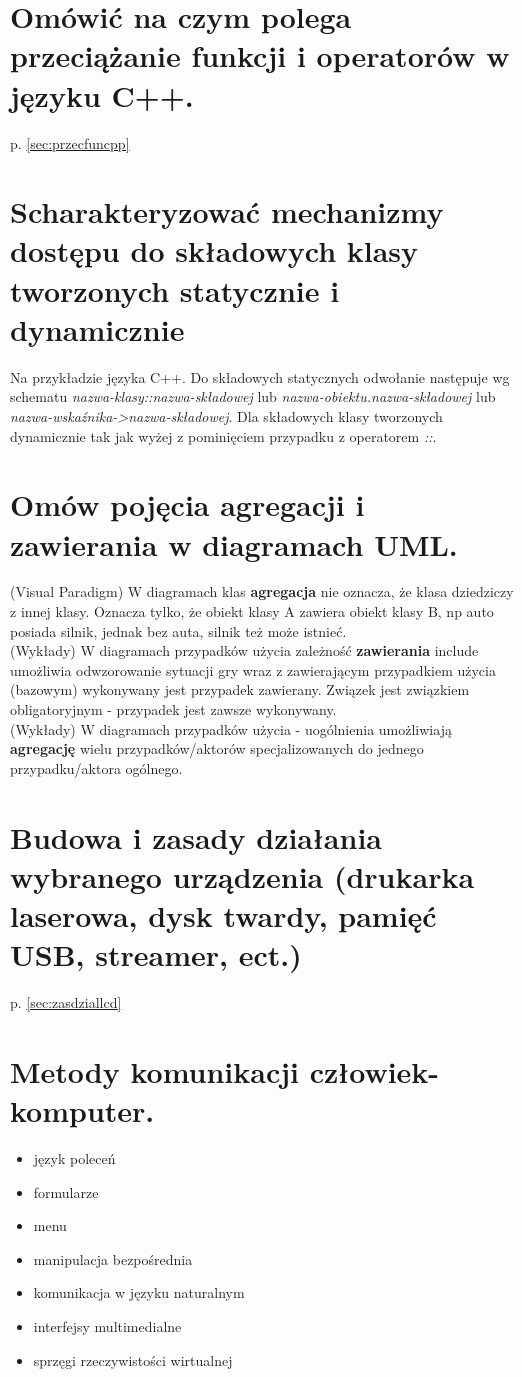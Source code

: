 \documentclass[12pt,a4paper]{article}
\begin{document}
	\section{Omówić na czym polega przeciążanie funkcji i operatorów w języku C++.}
	p. \ref{sec:przecfuncpp}

	\section{Scharakteryzować mechanizmy dostępu do składowych klasy tworzonych statycznie i dynamicznie}
	Na przykładzie języka C++. Do składowych statycznych odwołanie następuje wg schematu \textit{nazwa-klasy::nazwa-składowej} lub \textit{nazwa-obiektu.nazwa-składowej} lub \textit{nazwa-wskaźnika->nazwa-składowej}. Dla składowych klasy tworzonych dynamicznie tak jak wyżej z pominięciem przypadku z operatorem \textit{::}.

	\section{Omów pojęcia agregacji i zawierania w diagramach UML.}
	(Visual Paradigm) W diagramach klas \textbf{agregacja} nie oznacza, że klasa dziedziczy z innej klasy. Oznacza tylko, że obiekt klasy A zawiera obiekt klasy B, np auto 	posiada silnik, jednak bez auta, silnik też może istnieć.\\
(Wykłady) W diagramach przypadków użycia zależność \textbf{zawierania} include umożliwia odwzorowanie sytuacji gry wraz z zawierającym przypadkiem użycia (bazowym) wykonywany jest przypadek zawierany. Związek jest związkiem obligatoryjnym - przypadek jest zawsze wykonywany.\\
(Wykłady) W diagramach przypadków użycia - uogólnienia umożliwiają \textbf{agregację} wielu przypadków/aktorów specjalizowanych do jednego przypadku/aktora ogólnego.

	\section{Budowa i zasady działania wybranego urządzenia (drukarka laserowa, dysk twardy, pamięć USB, streamer, ect.)}
	p. \ref{sec:zasdziallcd}

	\section{Metody komunikacji człowiek-komputer.}
	\begin{itemize}
		\item język poleceń
		\item formularze
		\item menu
		\item manipulacja bezpośrednia
		\item komunikacja w języku naturalnym
		\item interfejsy multimedialne
		\item sprzęgi rzeczywistości wirtualnej
	\end{itemize}
\end{document}
